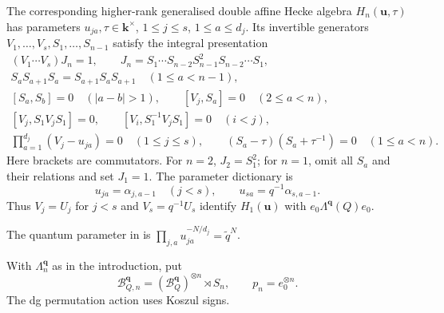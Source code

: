 \documentclass[a4paper]{amsart}
\newcommand{\kk}{\mathbf{k}}
\numberwithin{equation}{section}
\begin{document}
The corresponding higher-rank generalised double affine Hecke
algebra $H_n(\boldsymbol u,\tau)$ has parameters
$u_{ja},\tau\in\kk^\times$, $1\le j\le s$, $1\le a\le d_j$.
Its invertible generators $V_1,\ldots,V_s,S_1,\ldots,S_{n-1}$
satisfy the integral presentation
\cite[Definition~3.2.1]{EGO}
\begin{equation}\label{eq:higher-hecke}
\begin{gathered}
 (V_1\cdots V_s)J_n=1,\qquad
 J_n=S_1\cdots S_{n-2}S_{n-1}^2S_{n-2}\cdots S_1,\\
 S_aS_{a+1}S_a=S_{a+1}S_aS_{a+1}\quad(1\le a<n-1),\\
 [S_a,S_b]=0\quad(|a-b|>1),\qquad
 [V_j,S_a]=0\quad(2\le a<n),\\
 [V_j,S_1V_jS_1]=0,\qquad
 [V_i,S_1^{-1}V_jS_1]=0\quad(i<j),\\
 \prod_{a=1}^{d_j}(V_j-u_{ja})=0\quad(1\le j\le s),\qquad
 (S_a-\tau)(S_a+\tau^{-1})=0\quad(1\le a<n).
\end{gathered}
\end{equation}
Here brackets are commutators. For $n=2$, $J_2=S_1^2$; for
$n=1$, omit all $S_a$ and their relations and set $J_1=1$.
The parameter dictionary is
\[
 u_{ja}=\alpha_{j,a-1}\quad(j<s),\qquad
 u_{sa}=q^{-1}\alpha_{s,a-1}.
\]
Thus $V_j=U_j$ for $j<s$ and $V_s=q^{-1}U_s$ identify
$H_1(\boldsymbol u)$ with $e_0\Lambda^{\boldsymbol q}(Q)e_0$.

The quantum parameter in \cite[Section~5.1]{EGO} is
$\prod_{j,a}u_{ja}^{-N/d_j}=\widetilde q^N$.

With $\Lambda_n^{\boldsymbol q}$ as in the introduction, put
\[
 \mathcal B_{Q,n}^{\boldsymbol q}
   =(\mathcal B_Q^{\boldsymbol q})^{\otimes n}\rtimes S_n,
 \qquad p_n=e_0^{\otimes n}.
\]
The dg permutation action uses Koszul signs.
\end{document}
